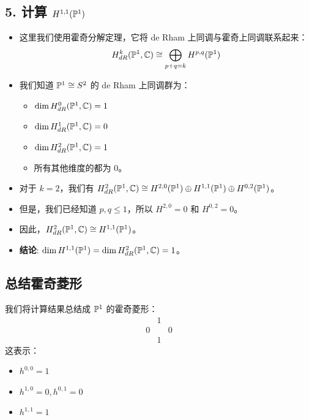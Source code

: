 \documentclass{amsart}
\let\originalmathbb\mathbb
\renewcommand{\mathbb}[1]{%
    \ifstrequal{#1}{1}{\mathbbm{#1}}{\originalmathbb{#1}}%
}
\theoremstyle{plain}
\theoremstyle{definition}
\theoremstyle{remark}
\begin{document}
\subsection{5. 计算 \texorpdfstring{$H^{1,1}(\mathbb{P}^1)$}{H^1,1(P^1)}}

\begin{itemize}
	\item 这里我们使用霍奇分解定理，它将 de Rham 上同调与霍奇上同调联系起来：
\[
H^k_{dR}(\mathbb{P}^1, \mathbb{C}) \cong \bigoplus_{p+q=k} H^{p,q}(\mathbb{P}^1)
\]
	\item 我们知道 $\mathbb{P}^1 \cong S^2$ 的 de Rham 上同调群为：
	\begin{itemize}
		\item $\dim H^0_{dR}(\mathbb{P}^1, \mathbb{C}) = 1$
		\item $\dim H^1_{dR}(\mathbb{P}^1, \mathbb{C}) = 0$
		\item $\dim H^2_{dR}(\mathbb{P}^1, \mathbb{C}) = 1$
		\item 所有其他维度的都为 0。
	\end{itemize}
	\item 对于 $k=2$，我们有 $H^2_{dR}(\mathbb{P}^1, \mathbb{C}) \cong H^{2,0}(\mathbb{P}^1) \oplus H^{1,1}(\mathbb{P}^1) \oplus H^{0,2}(\mathbb{P}^1)$。
	\item 但是，我们已经知道 $p,q \le 1$，所以 $H^{2,0}=0$ 和 $H^{0,2}=0$。
	\item 因此，$H^2_{dR}(\mathbb{P}^1, \mathbb{C}) \cong H^{1,1}(\mathbb{P}^1)$。
	\item \textbf{结论}: $\dim H^{1,1}(\mathbb{P}^1) = \dim H^2_{dR}(\mathbb{P}^1, \mathbb{C}) = 1$。
\end{itemize}

\subsection{总结霍奇菱形}

我们将计算结果总结成 $\mathbb{P}^1$ 的霍奇菱形：
\[
\begin{array}{ccc}
& 1 & \\
0 & & 0 \\
& 1 &
\end{array}
\]
这表示：

\begin{itemize}
	\item $h^{0,0} = 1$
	\item $h^{1,0} = 0, h^{0,1} = 0$
	\item $h^{1,1} = 1$
\end{itemize}
\end{document}
